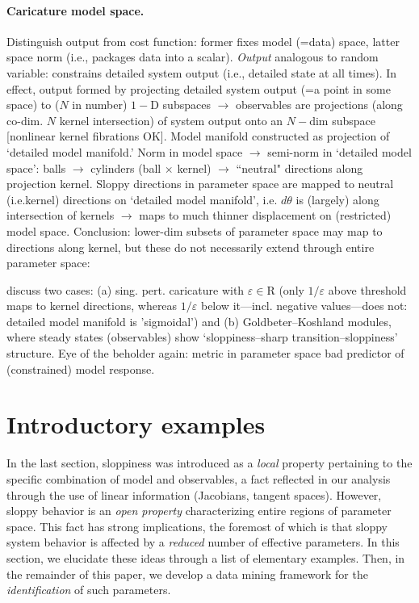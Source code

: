 \documentclass{article}
\newcommand{\eps}{\varepsilon}
\newcommand{\R}{\mathrm{R}}
\begin{document}
{\color{gray}\paragraph{Caricature model space.}
Distinguish output from cost function: former fixes model (=data)
space, latter space norm (i.e., packages data into a scalar).
\emph{Output} analogous to random variable: constrains detailed system
output (i.e., detailed state at all times).  In effect, output formed
by projecting detailed system output (=a point in some space) to ($N$
in number) $1-$D subspaces $\rightarrow$ observables are projections
(along co-dim. $N$ kernel intersection) of system output onto an
$N-$dim subspace [nonlinear kernel fibrations OK].  Model manifold
constructed as projection of `detailed model manifold.'  Norm in model
space $\rightarrow$ semi-norm in `detailed model space': balls
$\rightarrow$ cylinders (ball $\times$ kernel) $\rightarrow$
``neutral" directions along projection kernel.  Sloppy directions in
parameter space are mapped to neutral (i.e.kernel) directions on
`detailed model manifold', i.e. $d\theta$ is (largely) along
intersection of kernels $\rightarrow$ maps to much thinner
displacement on (restricted) model space.  Conclusion: lower-dim
subsets of parameter space may map to directions along kernel, but
these do not necessarily extend through entire parameter space:}
discuss two cases: (a) sing. pert. caricature with $\eps\in\R$ (only
$1/\eps$ above threshold maps to kernel directions, whereas $1/\eps$
below it---incl. negative values---does not: detailed model manifold
is 'sigmoidal') and (b) Goldbeter--Koshland modules, where steady
states (observables) show `sloppiness--sharp transition--sloppiness'
structure.  Eye of the beholder again: metric in parameter space bad
predictor of (constrained) model response.



\section{Introductory examples}
%
In the last section, sloppiness was introduced as a \emph{local} property
pertaining to the specific combination of model and observables,
a fact reflected in our analysis through the use of linear information (Jacobians, tangent spaces).
However, sloppy behavior is an \emph{open property}
characterizing entire regions of parameter space.
This fact has strong implications,
the foremost of which is that sloppy system behavior
is affected by a \emph{reduced} number of effective parameters.
In this section, we elucidate these ideas through a list of elementary examples.
Then, in the remainder of this paper, we develop a data mining framework
for the \emph{identification} of such parameters.\\
\end{document}
